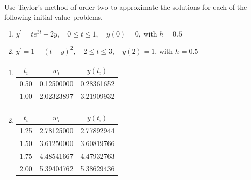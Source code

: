 \begin{myexercise}%
Use Taylor's method of order two to approximate the solutions for each of the following initial-value problems.\\
\begin{enumerate}[label=(\alph*)]
\item $ y^{\prime}=t e^{3 t}-2 y, \quad 0 \leq t \leq 1, \quad y(0)=0$, with $h=0.5$\\
\item $y^{\prime}=1+(t-y)^{2}, \quad 2 \leq t \leq 3, \quad y(2)=1$, with $h=0.5$
\end{enumerate}


\begin{mysolution}
\begin{enumerate}[label=(\alph*)]
\item
\begin{center}
\begin{tabular}{ccc}
\hline
$t_{i}$ & $w_{i}$ & $y\left(t_{i}\right)$ \\
\hline
0.50 & 0.12500000 & 0.28361652 \\
1.00 & 2.02323897 & 3.21909932 \\
\hline
\end{tabular}
\end{center}

\vspace{2mm}

\item
\begin{center}
\begin{tabular}{ccc}
\hline\hline
$t_{i}$ & $w_{i}$ & $y\left(t_{i}\right)$ \\
\hline
1.25 & 2.78125000 & 2.77892944 \\
1.50 & 3.61250000 & 3.60819766 \\
1.75 & 4.48541667 & 4.47932763 \\
2.00 & 5.39404762 & 5.38629436 \\
\hline
\end{tabular}
\end{center}


\end{enumerate}
\end{mysolution}
\end{myexercise}
